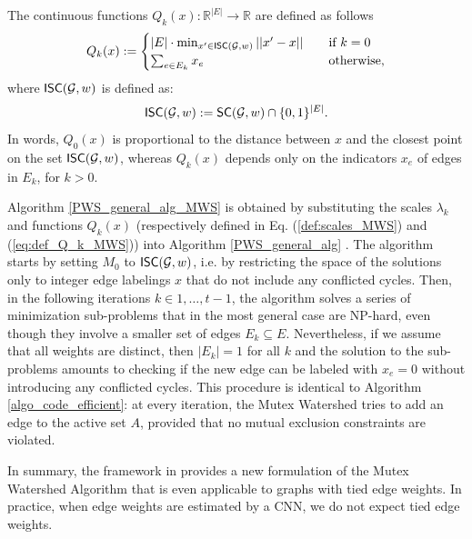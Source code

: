 \noindent The continuous functions $Q_k(x): \mathbb{R}^{|E|} \rightarrow \mathbb{R}$ are defined as follows
\begin{equation}
Q_k(x) := 
\begin{cases}
|E|\cdot \min_{x' \in \mathsf{ISC}(\mathcal{G},w)} ||x'-x|| \quad & \text{if } k=0\\
\sum_{e\in E_k} x_e & \text{otherwise,}\\
\end{cases} \label{eq:def_Q_k_MWS}
\end{equation}
where $\mathsf{ISC}(\mathcal{G},w)$ is defined as:
\begin{equation}
\mathsf{\intSC}(\mathcal{G},w) := \mathsf{SC}(\mathcal{G},w) \cap \{0,1\}^{|E|}. \label{def:\intSC}
\end{equation}
In words, $Q_0(x)$ is proportional to the distance between $x$ and the closest point on the set $\mathsf{ISC}(\mathcal{G},w)$, whereas $Q_k(x)$ depends only on the indicators $x_e$ of edges in $E_k$, for $k>0$. 


Algorithm \ref{PWS_general_alg_MWS} is obtained by substituting the scales $\lambda_k$ and functions $Q_k(x)$ (respectively defined in Eq. (\ref{def:scales_MWS}) and (\ref{eq:def_Q_k_MWS})) into Algorithm \ref{PWS_general_alg} .  
The algorithm starts by setting $M_0$ to $\mathsf{ISC}(\mathcal{G},w)$, i.e. by restricting the space of the solutions only to integer edge labelings $x$ that do not include any conflicted cycles. Then, in the following iterations $k \in 1, \ldots,t-1 $, the algorithm solves a series of minimization sub-problems that in the most general case are NP-hard, even though they involve a smaller set of edges $E_k\subseteq E$. 
Nevertheless, if we assume that all weights are distinct, then $|E_k|=1$ for all $k$ and the solution to the sub-problems amounts to checking if the new edge can be labeled with $x_e=0$ without introducing any conflicted cycles. This procedure is identical to Algorithm \ref{algo_code_efficient}: at every iteration, the Mutex Watershed tries to add an edge to the active set $A$, provided that no mutual exclusion constraints are violated. 

In summary, the framework in \cite{najman2017extending} provides a new formulation of the Mutex Watershed Algorithm that is even applicable to graphs with tied edge weights. In practice, when edge weights are estimated by a CNN, we do not expect tied edge weights.


